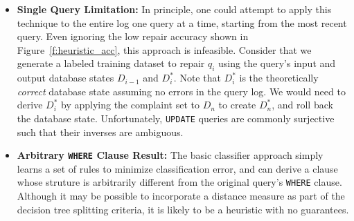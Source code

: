 \begin{itemize}[itemsep=1pt, leftmargin=5mm]
    
\item \textbf{Single Query Limitation: }
In principle, one could attempt to apply this technique to the
entire log one query at a time, starting from the most recent query.
Even ignoring the low repair accuracy shown in Figure~\ref{f:heuristic_acc},
this approach is infeasible.
Consider that we generate a labeled training dataset to repair $q_i$ 
using the query's input and output database states $D_{i-1}$ and $D_i^*$.
Note that $D_i^*$ is the theoretically \emph{correct} database state assuming no errors in the query log.
We would need to derive $D_i^*$ by applying the complaint set to $D_n$ to create $D_n^*$, and roll back the database state.
Unfortunately, \texttt{UPDATE} queries are commonly surjective such that their inverses are ambiguous.


\item \textbf{Arbitrary \texttt{WHERE} Clause Result: } 
The basic classifier approach simply learns a set of rules to minimize
classification error, and can derive a clause whose struture is arbitrarily 
different from the original query's \texttt{WHERE} clause.
Although it may be possible to incorporate a distance measure as part of the decision tree
splitting criteria, it is likely to be a heuristic with no guarantees.



\end{itemize}
